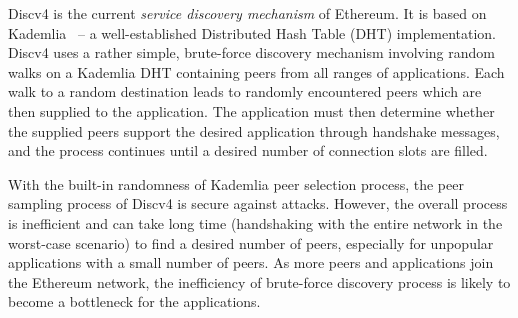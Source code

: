  Discv4 is the current \textit{service discovery mechanism} of Ethereum. It is based on Kademlia~\cite{maymounkov2002kademlia} – a well-established Distributed Hash Table (DHT) implementation. Discv4 uses a rather simple, brute-force discovery mechanism involving random walks on a Kademlia DHT containing peers from all ranges of applications. Each walk to a random destination leads to randomly encountered peers which are then supplied to the application. The application must then determine whether the supplied peers support the desired application through handshake messages, and the process continues until a desired number of connection slots are filled. 

With the built-in randomness of Kademlia peer selection process, the peer sampling process of Discv4 is secure against attacks. However, the overall process is inefficient and can take long time (\ie handshaking with the entire network in the worst-case scenario) to find a desired number of peers, especially for unpopular applications with a small number of peers. As more peers and applications join the Ethereum network, the inefficiency of brute-force discovery process is likely to become a bottleneck for the applications.




